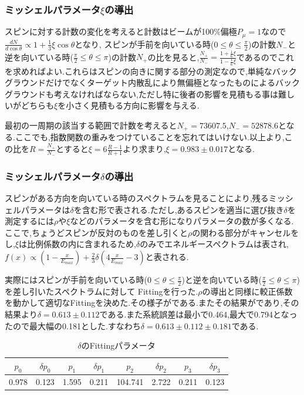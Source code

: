 \subsubsection{ミッシェルパラメータ$\xi$の導出}
スピンに対する計数の変化を考えると計数はビームが100\%偏極$P_{\mu}=1$なので$\frac{dN}{d\cos\theta}\propto 1+\frac{1}{3}\xi\cos\theta$となり,
スピンが手前を向いている時($0\leq\theta\leq\frac{\pi}{2}$)の計数$N_-$と逆を向いている時($\frac{\pi}{2}\leq\theta\leq\pi$)の計数$N_+$の比を見ると,$\frac{N_+}{N_-}=\frac{1+\frac{1}{6}\xi}{1-\frac{1}{6}\xi}$であるのでこれを求めればよい.これらはスピンの向きに関する部分の測定なので,単純なバックグラウンドだけでなくターゲット内散乱により無偏極となったものによるバックグラウンドも考えなければならない,ただし特に後者の影響を見積もる事は難しいがどちらも$\xi$を小さく見積もる方向に影響を与える.

最初の一周期の該当する範囲で計数を考えると$N_+=73607.5$,$N_-=52878.6$となる.ここでも,指数関数の重みをつけていることを忘れてはいけない.以上より,この比を$R=\frac{N_+}{N_-}$とすると$\xi=6\frac{R-1}{R+1}$より求まり,$\xi=0.983\pm0.017$となる.


\subsubsection{ミッシェルパラメータ$\delta$の導出}
スピンがある方向を向いている時のスペクトラムを見ることにより,残るミッシェルパラメータは$\delta$を含む形で表される.ただし,あるスピンを適当に選び抜き$\delta$を測定するには$\rho$や$\xi$などのパラメータを含む形になりパラメータの数が多くなる.ここで,ちょうどスピンが反対のものを差し引くと$\rho$の関わる部分がキャンセルをし,$\xi$は比例係数の内に含まれるため,$\delta$のみでエネルギースペクトラムは表され,$f(x)\propto(1-\frac{x}{E_{max}})+\frac{2}{3}\delta(4\frac{x}{E_{max}}-3)$と表される.

実際にはスピンが手前を向いている時($0\leq\theta\leq\frac{\pi}{2}$)と逆を向いている時($\frac{\pi}{2}\leq\theta\leq\pi$)を差し引いたスペクトラムに対して
Fittingを行った.$\rho$の導出と同様に較正係数を動かして適切なFittingを決めた.その様子がである.またその結果がであり,その結果より$\delta=0.613\pm0.112$である.また系統誤差は最小で0.464,最大で0.794となったので最大幅の0.181とした.すなわち$\delta=0.613\pm0.112\pm0.181$である.
\begin{table}[bht]
  \centering
  \caption{$\delta$のFittingパラメータ}
  \begin{tabular}{cccccccc}
    $p_0$ & $\delta p_0$ & $p_1$ & $\delta p_1$ & $p_2$ & $\delta p_2$ & $p_3$ & $\delta p_3$ \\ \hline
    0.978 & 0.123 & 1.595 & 0.211 & 104.741 & 2.722 & 0.211 & 0.123 \\
  \end{tabular}
  \label{hatano_tab:delta}
\end{table}


